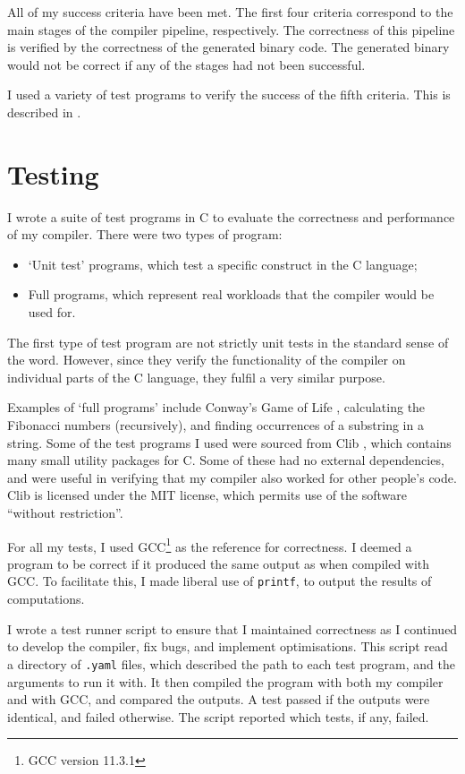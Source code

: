 \documentclass[00-main.tex]{subfiles}
\begin{document}
All of my success criteria have been met.
The first four criteria correspond to the main stages of the compiler pipeline, respectively.
The correctness of this pipeline is verified by the correctness of the generated binary code.
The generated binary would not be correct if any of the stages had not been successful.

I used a variety of test programs to verify the success of the fifth criteria. This is described in .


\section{Testing} \label{sec:eval:testing}

I wrote a suite of test programs in C to evaluate the correctness and performance of my compiler.
There were two types of program:
\begin{itemize}
\item `Unit test' programs, which test a specific construct in the C language;
\item Full programs, which represent real workloads that the compiler would be used for.
\end{itemize}

The first type of test program are not strictly unit tests in the standard sense of the word. However, since they verify the functionality of the compiler on individual parts of the C language, they fulfil a very similar purpose.

Examples of `full programs' include Conway's Game of Life \cite{conways-game-of-life}, calculating the Fibonacci numbers (recursively), and finding occurrences of a substring in a string.
Some of the test programs I used were sourced from Clib \cite{clib}, which contains many small utility packages for C. Some of these had no external dependencies, and were useful in verifying that my compiler also worked for other people's code. Clib is licensed under the MIT license, which permits use of the software ``without restriction''.

For all my tests, I used GCC\footnote{GCC version 11.3.1} as the reference for correctness.
I deemed a program to be correct if it produced the same output as when compiled with GCC.
To facilitate this, I made liberal use of \texttt{printf}, to output the results of computations.

I wrote a test runner script to ensure that I maintained correctness as I continued to develop the compiler, fix bugs, and implement optimisations.
This script read a directory of \texttt{.yaml} files, which described the path to each test program, and the arguments to run it with.
It then compiled the program with both my compiler and with GCC, and compared the outputs.
A test passed if the outputs were identical, and failed otherwise.
The script reported which tests, if any, failed.
\end{document}
